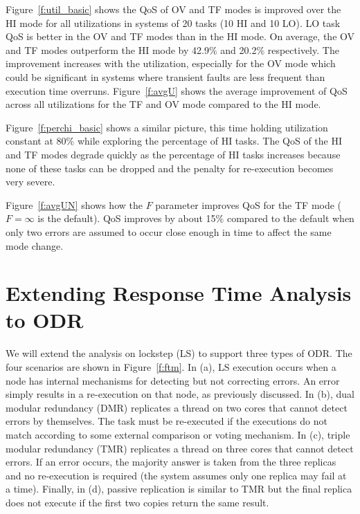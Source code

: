 
	Figure~\ref{f:util_basic} shows the QoS of OV and TF modes is improved over the HI mode for all utilizations in systems of 20 tasks (10 HI and 10 LO). LO task QoS is better in the OV and TF modes than in the HI mode. On average, the OV and TF modes outperform the HI mode by 42.9\% and 20.2\% respectively. The improvement increases with the utilization, especially for the OV mode which could be significant in systems where transient faults are less frequent than execution time overruns. Figure~\ref{f:avgU} shows the average improvement of QoS across all utilizations for the TF and OV mode compared to the HI mode.
	
	
	Figure~\ref{f:perchi_basic} shows a similar picture, this time holding utilization constant at 80\% while exploring the percentage of HI tasks. The QoS of the HI and TF modes degrade quickly as the percentage of HI tasks increases because none of these tasks can be dropped and the penalty for re-execution becomes very severe.
	 	
	Figure~\ref{f:avgUN} shows how the $F$ parameter improves QoS for the TF mode ($F=\infty$ is the default). QoS improves by about 15\% compared to the default when only two errors are assumed to occur close enough in time to affect the same mode change.

\section{Extending Response Time Analysis to ODR}

	We will extend the analysis on lockstep (LS) to support three types of ODR. The four scenarios are shown in Figure~\ref{f:ftm}. 
	In (a), LS execution occurs when a node has internal mechanisms for detecting but not correcting errors. 
	An error simply results in a re-execution on that node, as previously discussed. 	
	In (b), dual modular redundancy (DMR) replicates a thread on two cores that cannot detect errors by themselves. 
	The task must be re-executed if the executions do not match according to some external comparison or voting mechanism.
	In (c), triple modular redundancy (TMR) replicates a thread on three cores that cannot detect errors. 
	If an error occurs, the majority answer is taken from the three replicas and no re-execution is required (the system assumes only one replica may fail at a time).
	Finally, in (d), passive replication is similar to TMR but the final replica does not execute if the first two copies return the same result. 


